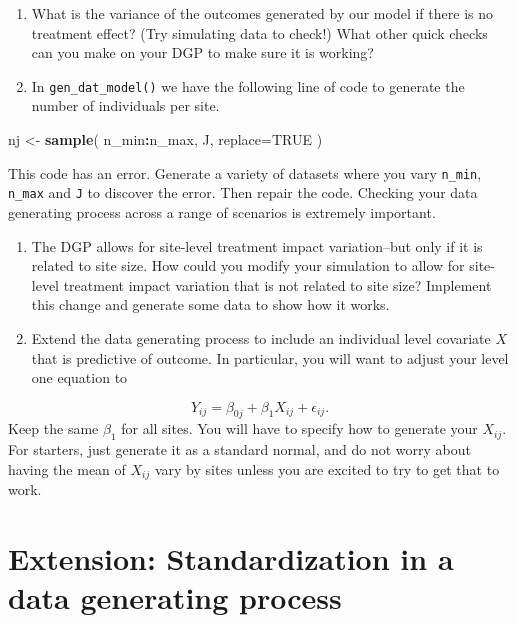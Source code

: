 \documentclass[
]{book}
\newenvironment{Shaded}{\begin{snugshade}}{\end{snugshade}}
\newcommand{\AttributeTok}[1]{\textcolor[rgb]{0.13,0.29,0.53}{#1}}
\newcommand{\ConstantTok}[1]{\textcolor[rgb]{0.56,0.35,0.01}{#1}}
\newcommand{\FunctionTok}[1]{\textcolor[rgb]{0.13,0.29,0.53}{\textbf{#1}}}
\newcommand{\NormalTok}[1]{#1}
\newcommand{\OtherTok}[1]{\textcolor[rgb]{0.56,0.35,0.01}{#1}}
\newcommand{\SpecialCharTok}[1]{\textcolor[rgb]{0.81,0.36,0.00}{\textbf{#1}}}
\begin{document}
\begin{enumerate}
\def\labelenumi{\arabic{enumi}.}
\setcounter{enumi}{3}
\item
  What is the variance of the outcomes generated by our model if there is no treatment effect? (Try simulating data to check!) What other quick checks can you make on your DGP to make sure it is working?
\item
  In \texttt{gen\_dat\_model()} we have the following line of code to generate the number of individuals per site.
\end{enumerate}

\begin{Shaded}
\begin{Highlighting}[]
\NormalTok{nj }\OtherTok{\textless{}{-}} \FunctionTok{sample}\NormalTok{( n\_min}\SpecialCharTok{:}\NormalTok{n\_max, J, }
                 \AttributeTok{replace=}\ConstantTok{TRUE}\NormalTok{ )}
\end{Highlighting}
\end{Shaded}

This code has an error. Generate a variety of datasets where you vary \texttt{n\_min}, \texttt{n\_max} and \texttt{J} to discover the error. Then repair the code.
Checking your data generating process across a range of scenarios is extremely important.

\begin{enumerate}
\def\labelenumi{\arabic{enumi}.}
\setcounter{enumi}{5}
\item
  The DGP allows for site-level treatment impact variation--but only if it is related to site size. How could you modify your simulation to allow for site-level treatment impact variation that is not related to site size? Implement this change and generate some data to show how it works.
\item
  Extend the data generating process to include an individual level covariate \(X\) that is predictive of outcome. In particular, you will want to adjust your level one equation to
\end{enumerate}

\[ Y_{ij} = \beta_{0j} + \beta_{1} X_{ij} + \epsilon_{ij} . \]
Keep the same \(\beta_1\) for all sites.
You will have to specify how to generate your \(X_{ij}\).
For starters, just generate it as a standard normal, and do not worry about having the mean of \(X_{ij}\) vary by sites unless you are excited to try to get that to work.

\section{Extension: Standardization in a data generating process}\label{extension-standardization-in-a-data-generating-process}
\end{document}
